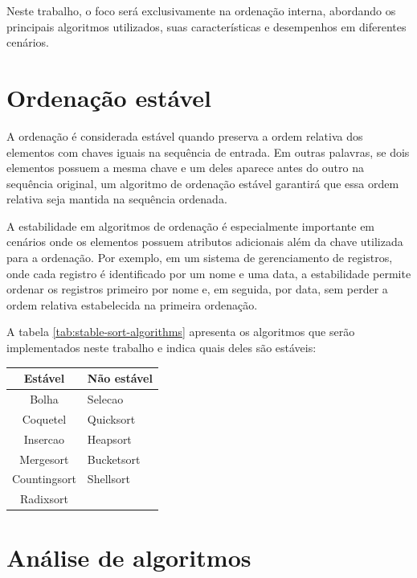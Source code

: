 Neste trabalho, o foco será exclusivamente na ordenação interna, abordando os principais algoritmos utilizados, suas características e desempenhos em diferentes cenários.

\section{Ordenação estável}
A ordenação é considerada estável quando preserva a ordem relativa dos elementos com chaves iguais na sequência de entrada. Em outras palavras, se dois elementos possuem a mesma chave e um deles aparece antes do outro na sequência original, um algoritmo de ordenação estável garantirá que essa ordem relativa seja mantida na sequência ordenada.

A estabilidade em algoritmos de ordenação é especialmente importante em cenários onde os elementos possuem atributos adicionais além da chave utilizada para a ordenação. Por exemplo, em um sistema de gerenciamento de registros, onde cada registro é identificado por um nome e uma data, a estabilidade permite ordenar os registros primeiro por nome e, em seguida, por data, sem perder a ordem relativa estabelecida na primeira ordenação.

A tabela \ref{tab:stable-sort-algorithms} apresenta os algoritmos que serão implementados neste trabalho e indica quais deles são estáveis:

\begin{table}[!h]
    \centering
    \begin{tabular}{ | c | l |  }
    \hline
    Estável      & Não estável\\
    \hline
    Bolha        & Selecao    \\
    Coquetel     & Quicksort  \\
    Insercao     & Heapsort   \\
    Mergesort    & Bucketsort \\
    Countingsort & Shellsort  \\
    Radixsort    &            \\
    \hline
    \end{tabular}
\end{table}


\section{Análise de algoritmos}

